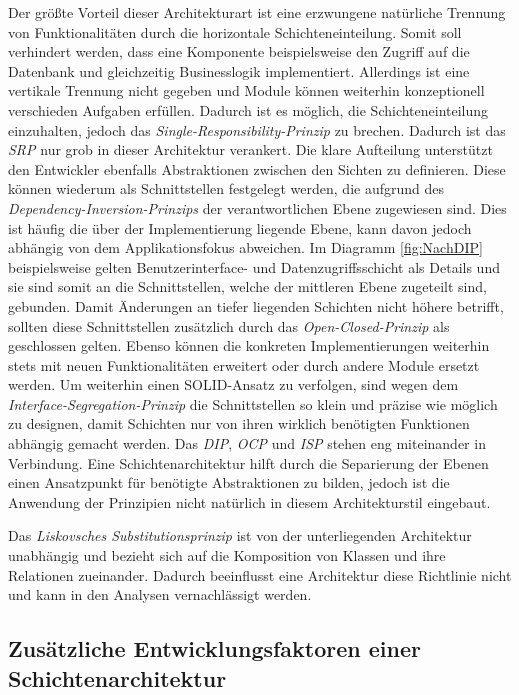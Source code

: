 \documentclass[conference]{IEEEtran}
\begin{document}
Der größte Vorteil dieser Architekturart ist eine erzwungene natürliche Trennung von Funktionalitäten durch die horizontale Schichteneinteilung. Somit soll verhindert werden, dass eine Komponente beispielsweise den Zugriff auf die Datenbank und gleichzeitig Businesslogik implementiert. Allerdings ist eine vertikale Trennung nicht gegeben und Module können weiterhin konzeptionell verschieden Aufgaben erfüllen. Dadurch ist es möglich, die Schichteneinteilung einzuhalten, jedoch das \emph{Single-Responsibility-Prinzip} zu brechen. Dadurch ist das \emph{SRP} nur grob in dieser Architektur verankert. Die klare Aufteilung unterstützt den Entwickler ebenfalls Abstraktionen zwischen den Sichten zu definieren. Diese können wiederum als Schnittstellen festgelegt werden, die aufgrund des \emph{Dependency-Inversion-Prinzips} der verantwortlichen Ebene zugewiesen sind. Dies ist häufig die über der Implementierung liegende Ebene, kann davon jedoch abhängig von dem Applikationsfokus abweichen. Im Diagramm \ref{fig:NachDIP} beispielsweise gelten Benutzerinterface- und Datenzugriffsschicht als Details und sie sind somit an die Schnittstellen, welche der mittleren Ebene zugeteilt sind, gebunden. Damit Änderungen an tiefer liegenden Schichten nicht höhere betrifft, sollten diese Schnittstellen zusätzlich durch das \emph{Open-Closed-Prinzip} als geschlossen gelten. Ebenso können die konkreten Implementierungen weiterhin stets mit neuen Funktionalitäten erweitert oder durch andere Module ersetzt werden. Um weiterhin einen SOLID-Ansatz zu verfolgen, sind wegen dem \emph{Interface-Segregation-Prinzip} die Schnittstellen so klein und präzise wie möglich zu designen, damit Schichten nur von ihren wirklich benötigten Funktionen abhängig gemacht werden. Das \emph{DIP}, \emph{OCP} und \emph{ISP} stehen eng miteinander in Verbindung. Eine Schichtenarchitektur hilft durch die Separierung der Ebenen einen Ansatzpunkt für benötigte Abstraktionen zu bilden, jedoch ist die Anwendung der Prinzipien nicht natürlich in diesem Architekturstil eingebaut.  

Das \emph{Liskovsches Substitutionsprinzip} ist von der unterliegenden Architektur unabhängig und bezieht sich auf die Komposition von Klassen und ihre Relationen zueinander. Dadurch beeinflusst eine Architektur diese Richtlinie nicht und kann in den Analysen vernachlässigt werden.



\subsection{Zusätzliche Entwicklungsfaktoren einer Schichtenarchitektur}
\end{document}
